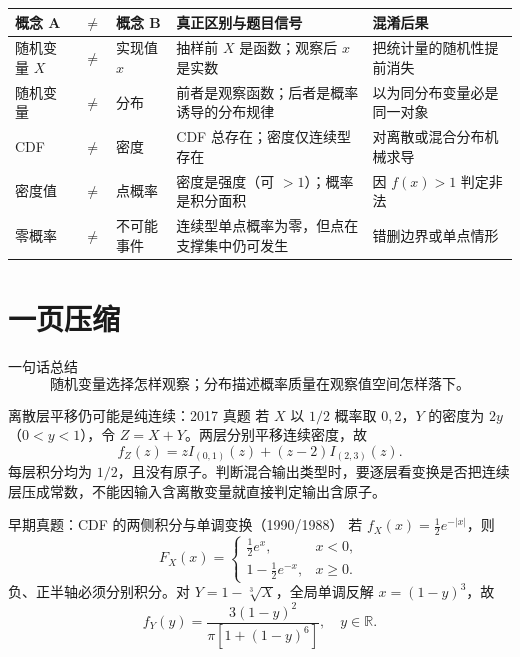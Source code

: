 \documentclass[11pt,a4paper]{ctexart}
\begin{document}
\small
\begin{longtable}{L{2.8cm}L{2.8cm}L{3.4cm}L{3.2cm}L{2.8cm}}
\toprule
\textbf{概念 A} & \textbf{$\ne$} & \textbf{概念 B} & \textbf{真正区别与题目信号} & \textbf{混淆后果}\\
\midrule
随机变量 $X$ & $\ne$ & 实现值 $x$ & 抽样前 $X$ 是函数；观察后 $x$ 是实数 & 把统计量的随机性提前消失\\
随机变量 & $\ne$ & 分布 & 前者是观察函数；后者是概率诱导的分布规律 & 以为同分布变量必是同一对象\\
CDF & $\ne$ & 密度 & CDF 总存在；密度仅连续型存在 & 对离散或混合分布机械求导\\
密度值 & $\ne$ & 点概率 & 密度是强度（可 $>1$）；概率是积分面积 & 因 $f(x)>1$ 判定非法\\
零概率 & $\ne$ & 不可能事件 & 连续型单点概率为零，但点在支撑集中仍可发生 & 错删边界或单点情形\\
\bottomrule
\end{longtable}
\normalsize

\section{一页压缩}

\begin{corebox}{一句话总结}
\[
\boxed{\text{随机变量选择怎样观察；分布描述概率质量在观察值空间怎样落下。}}
\]
\end{corebox}

\begin{examplebox}{离散层平移仍可能是纯连续：2017 真题}
若 $X$ 以 $1/2$ 概率取 $0,2$，$Y$ 的密度为 $2y$（$0<y<1$），令 $Z=X+Y$。两层分别平移连续密度，故
\[
f_Z(z)=zI_{(0,1)}(z)+(z-2)I_{(2,3)}(z).
\]
每层积分均为 $1/2$，且没有原子。判断混合输出类型时，要逐层看变换是否把连续层压成常数，不能因输入含离散变量就直接判定输出含原子。
\end{examplebox}

\begin{examplebox}{早期真题：CDF 的两侧积分与单调变换（1990/1988）}
若 $f_X(x)=\tfrac12e^{-|x|}$，则
\[
F_X(x)=\begin{cases}\tfrac12e^x,&x<0,\\1-\tfrac12e^{-x},&x\ge0.\end{cases}
\]
负、正半轴必须分别积分。对 $Y=1-\sqrt[3]{X}$，全局单调反解 $x=(1-y)^3$，故
\[
f_Y(y)=\frac{3(1-y)^2}{\pi[1+(1-y)^6]},\quad y\in\mathbb R.
\]
\end{examplebox}
\end{document}
